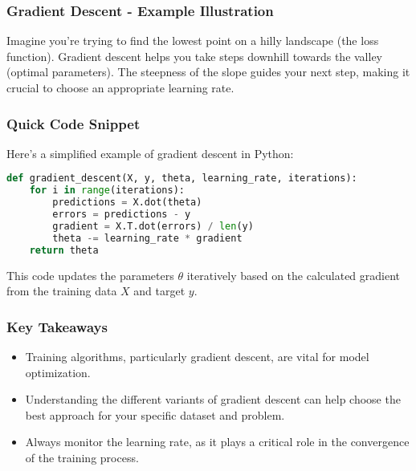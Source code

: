 \documentclass[aspectratio=169]{beamer}
\begin{document}
\begin{frame}
    \frametitle{Gradient Descent - Example Illustration}
    Imagine you're trying to find the lowest point on a hilly landscape (the loss function). Gradient descent helps you take steps downhill towards the valley (optimal parameters). The steepness of the slope guides your next step, making it crucial to choose an appropriate learning rate.
\end{frame}

\begin{frame}[fragile]
    \frametitle{Quick Code Snippet}
    Here’s a simplified example of gradient descent in Python:
    \begin{lstlisting}[language=Python]
def gradient_descent(X, y, theta, learning_rate, iterations):
    for i in range(iterations):
        predictions = X.dot(theta)
        errors = predictions - y
        gradient = X.T.dot(errors) / len(y)
        theta -= learning_rate * gradient
    return theta
    \end{lstlisting}
    This code updates the parameters $\theta$ iteratively based on the calculated gradient from the training data $X$ and target $y$.
\end{frame}

\begin{frame}
    \frametitle{Key Takeaways}
    \begin{itemize}
        \item Training algorithms, particularly gradient descent, are vital for model optimization.
        \item Understanding the different variants of gradient descent can help choose the best approach for your specific dataset and problem.
        \item Always monitor the learning rate, as it plays a critical role in the convergence of the training process.
    \end{itemize}
\end{frame}
\end{document}

